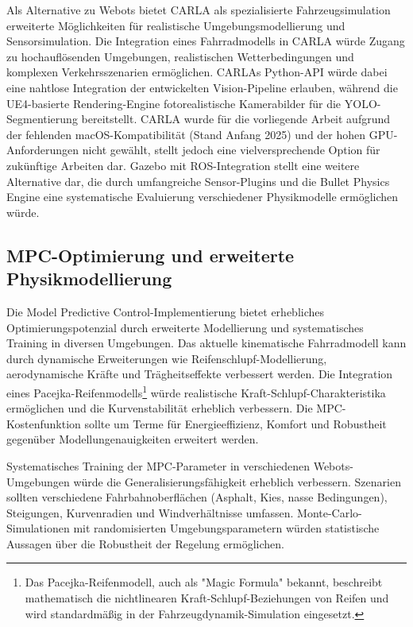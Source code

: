 Als Alternative zu Webots bietet CARLA als spezialisierte Fahrzeugsimulation erweiterte Möglichkeiten für realistische 
Umgebungsmodellierung und Sensorsimulation. Die Integration eines Fahrradmodells in CARLA würde Zugang zu hochauflösenden 
Umgebungen, realistischen Wetterbedingungen und komplexen Verkehrsszenarien ermöglichen. CARLAs Python-API würde dabei 
eine nahtlose Integration der entwickelten Vision-Pipeline erlauben, während die UE4-basierte Rendering-Engine 
fotorealistische Kamerabilder für die YOLO-Segmentierung bereitstellt. CARLA wurde für die vorliegende Arbeit aufgrund 
der fehlenden macOS-Kompatibilität (Stand Anfang 2025) und der hohen GPU-Anforderungen nicht gewählt, stellt jedoch 
eine vielversprechende Option für zukünftige Arbeiten dar. Gazebo mit ROS-Integration stellt eine weitere 
Alternative dar, die durch umfangreiche Sensor-Plugins und die Bullet Physics Engine eine systematische Evaluierung 
verschiedener Physikmodelle ermöglichen würde.

\subsection{MPC-Optimierung und erweiterte Physikmodellierung}

Die Model Predictive Control-Implementierung bietet erhebliches Optimierungspotenzial durch erweiterte Modellierung und 
systematisches Training in diversen Umgebungen. Das aktuelle kinematische Fahrradmodell kann durch dynamische Erweiterungen 
wie Reifenschlupf-Modellierung, aerodynamische Kräfte und Trägheitseffekte verbessert werden. Die Integration eines 
Pacejka-Reifenmodells\footnote{Das Pacejka-Reifenmodell, auch als "Magic Formula" bekannt, beschreibt mathematisch die 
nichtlinearen Kraft-Schlupf-Beziehungen von Reifen und wird standardmäßig in der Fahrzeugdynamik-Simulation eingesetzt.} 
würde realistische Kraft-Schlupf-Charakteristika ermöglichen und die Kurvenstabilität erheblich 
verbessern. Die MPC-Kostenfunktion sollte um Terme für Energieeffizienz, Komfort und Robustheit gegenüber 
Modellungenauigkeiten erweitert werden.

Systematisches Training der MPC-Parameter in verschiedenen Webots-Umgebungen würde die Generalisierungsfähigkeit erheblich 
verbessern. Szenarien sollten verschiedene Fahrbahnoberflächen (Asphalt, Kies, nasse Bedingungen), Steigungen, Kurvenradien 
und Windverhältnisse umfassen. Monte-Carlo-Simulationen mit randomisierten Umgebungsparametern würden statistische Aussagen 
über die Robustheit der Regelung ermöglichen.

